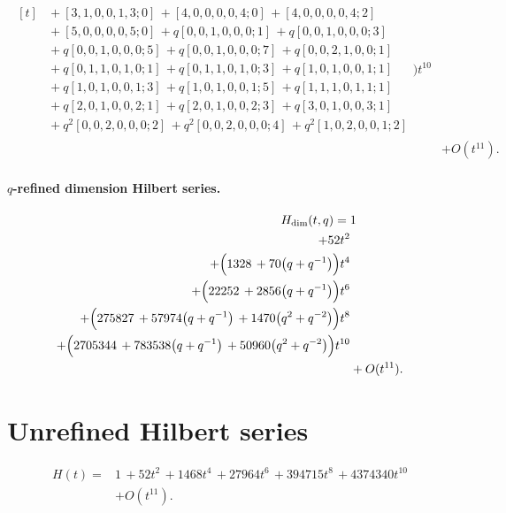 \documentclass[10pt]{article}
\begin{document}
\[\begin{aligned}
\begin{aligned}[t]
  &{}+[3,1,0,0,1,3;0]\,+[4,0,0,0,0,4;0]\,+[4,0,0,0,0,4;2] \\
  &{}+[5,0,0,0,0,5;0]\,+q[0,0,1,0,0,0;1]\,+q[0,0,1,0,0,0;3] \\
  &{}+q[0,0,1,0,0,0;5]\,+q[0,0,1,0,0,0;7]\,+q[0,0,2,1,0,0;1] \\
  &{}+q[0,1,1,0,1,0;1]\,+q[0,1,1,0,1,0;3]\,+q[1,0,1,0,0,1;1] \\
  &{}+q[1,0,1,0,0,1;3]\,+q[1,0,1,0,0,1;5]\,+q[1,1,1,0,1,1;1] \\
  &{}+q[2,0,1,0,0,2;1]\,+q[2,0,1,0,0,2;3]\,+q[3,0,1,0,0,3;1] \\
  &{}+q^{2}[0,0,2,0,0,0;2]\,+q^{2}[0,0,2,0,0,0;4]\,+q^{2}[1,0,2,0,0,1;2]\end{aligned}\Bigr)t^{10} \\
  &+ O(t^{11}).
\end{aligned}
\]
\paragraph{$q$-refined dimension Hilbert series.}
\[
\begin{aligned}
H_{\mathrm{dim}}(t,q) ={}&
   1 \\
  + 52t^{2} \\
  + \Bigl(1328\,+70\bigl(q+q^{-1}\bigr)\Bigr)t^{4} \\
  + \Bigl(22252\,+2856\bigl(q+q^{-1}\bigr)\Bigr)t^{6} \\
  + \Bigl(275827\,+57974\bigl(q+q^{-1}\bigr)\,+1470\bigl(q^{2}+q^{-2}\bigr)\Bigr)t^{8} \\
  + \Bigl(2705344\,+783538\bigl(q+q^{-1}\bigr)\,+50960\bigl(q^{2}+q^{-2}\bigr)\Bigr)t^{10} \\
  &+ O(t^{11}).
\end{aligned}
\]

\section{Unrefined Hilbert series}
\[
\begin{aligned}
H(t) ={}& 1\,+52t^{2}\,+1468t^{4}\,+27964t^{6}\,+394715t^{8}\,+4374340t^{10} \\
  &+ O(t^{11}).
\end{aligned}
\]
\end{document}
